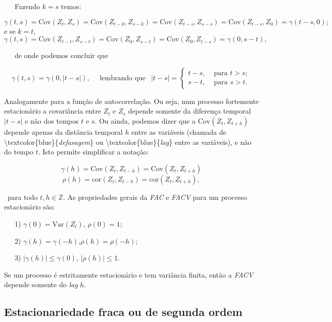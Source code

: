\documentclass[
]{book}
\theoremstyle{definition}
\theoremstyle{definition}
\theoremstyle{definition}
\theoremstyle{remark}
\begin{document}
~~~Fazendo \(k = s\) temos:

\[\gamma(t,s)= \mbox{Cov}(Z_t, Z_s) = \mbox{Cov}(Z_{t-k}, Z_{s-k} )=\mbox{Cov}(Z_{t-s}, Z_{s-s} ) = \mbox{Cov}(Z_{t-s}, Z_0 )=\gamma(t-s,0);\]
e se \(k=t\),
\[ \gamma(t,s)= \mbox{Cov}(Z_{t-t}, Z_{s-t} ) = \mbox{Cov} (Z_0 , Z_{s-t} )= \mbox{Cov} (Z_0 , Z_{t-s} )= \gamma(0,s-t),\]

~~~de onde podemos concluir que

\begin{equation*}
\gamma(t,s) = \gamma(0,|t-s|),\quad \mbox{ lembrando que }\ \
|t - s| =\begin{cases}
t - s, & \mbox{ para  } t > s;\\
s - t, & \mbox{ para } s > t.
\end{cases}
\end{equation*}

Analogamente para a função de autocorrelação. Ou seja, num processo fortemente estacionário a covariância entre \(Z_t\) e \(Z_s\) depende somente da diferença temporal \(|t - s|\) e não dos tempos \(t\) e \(s\). Ou ainda, podemos dizer que a \(\mbox{Cov}(Z_t,Z_{t+h})\) depende apenas da distância temporal \(h\) entre as variáveis (chamada de \textbackslash textcolor\{blue\}\{\emph{defasagem}\} ou \textbackslash textcolor\{blue\}\{\emph{lag}\} entre as variáveis), e não do tempo \(t\). Isto permite simplificar a notação:

\[ \gamma(h)= \mbox{Cov}(Z_t, Z_{t-h} )=\mbox{Cov}(Z_t, Z_{t+h} )\]
\[ \rho(h)= \mbox{cor}(Z_t, Z_{t-h} )= \mbox{cor}(Z_t, Z_{t+h} ),\]

~para todo \(t,h\in\mathbb{Z}\). As propriedades gerais da \emph{FAC} e \emph{FACV} para um processo estacionário são:

~~~1) \(\gamma(0) = \mbox{Var}(Z_t)\), \quad \(\rho(0) = 1\);

~~~2) \(\gamma(h) = \gamma(-h)\),\quad \(\rho(h) = \rho(-h)\);

~~~3) \(|\gamma(h)|\leq \gamma(0)\), \quad \(|\rho(h)|\leq 1\).

Se um processo é estritamente estacionário e tem variância finita, então a \emph{FACV} depende somente do \emph{lag} \(h\).

\hypertarget{estacionariedade-fraca-ou-de-segunda-ordem}{%
\subsection{Estacionariedade fraca ou de segunda ordem}\label{estacionariedade-fraca-ou-de-segunda-ordem}}
\end{document}

